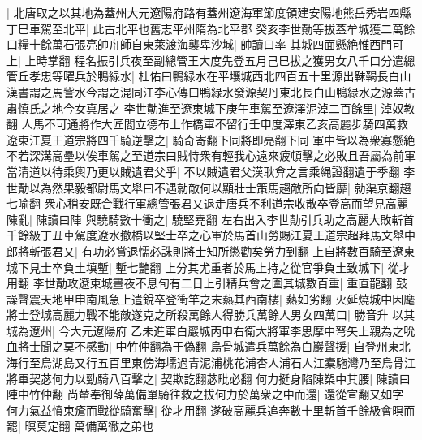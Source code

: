 |{
	北唐取之以其地為蓋州大元遼陽府路有蓋州遼海軍節度領建安陽地熊岳秀岩四縣}
丁巳車駕至北平|{
	此古北平也舊志平州隋為北平郡}
癸亥李世勣等拔蓋牟城獲二萬餘口糧十餘萬石張亮帥舟師自東萊渡海襲卑沙城|{
	帥讀曰率}
其城四面懸絶惟西門可上|{
	上時掌翻}
程名振引兵夜至副總管王大度先登五月己巳拔之獲男女八千口分遣總管丘孝忠等曜兵於鴨緑水|{
	杜佑曰鴨緑水在平壤城西北四百五十里源出靺鞨長白山漢書謂之馬訾水今謂之混同江李心傳曰鴨緑水發源契丹東北長白山鴨緑水之源蓋古肅慎氏之地今女真居之}
李世勣進至遼東城下庚午車駕至遼澤泥淖二百餘里|{
	淖奴教翻}
人馬不可通將作大匠閻立德布土作橋軍不留行壬申度澤東乙亥高麗步騎四萬救遼東江夏王道宗將四千騎逆擊之|{
	騎奇寄翻下同將即亮翻下同}
軍中皆以為衆寡懸絶不若深溝高壘以俟車駕之至道宗曰賊恃衆有輕我心遠來疲頓擊之必敗且吾屬為前軍當清道以待乘輿乃更以賊遺君父乎|{
	不以賊遺君父漢耿弇之言乘䋲證翻遺于季翻}
李世勣以為然果毅都尉馬文舉曰不遇勍敵何以顯壯士策馬趨敵所向皆靡|{
	勍渠京翻趨七喻翻}
衆心稍安既合戰行軍總管張君乂退走唐兵不利道宗收散卒登高而望見高麗陳亂|{
	陳讀曰陣}
與驍騎數十衝之|{
	驍堅堯翻}
左右出入李世勣引兵助之高麗大敗斬首千餘級丁丑車駕度遼水撤橋以堅士卒之心軍於馬首山勞賜江夏王道宗超拜馬文舉中郎將斬張君乂|{
	有功必賞退懦必誅則將士知所懲勸矣勞力到翻}
上自將數百騎至遼東城下見士卒負土填塹|{
	塹七艷翻}
上分其尤重者於馬上持之從官爭負土致城下|{
	從才用翻}
李世勣攻遼東城晝夜不息旬有二日上引精兵會之圍其城數百重|{
	重直龍翻}
鼓譟聲震天地甲申南風急上遣銳卒登衝竿之末爇其西南樓|{
	爇如劣翻}
火延燒城中因麾將士登城高麗力戰不能敵遂克之所殺萬餘人得勝兵萬餘人男女四萬口|{
	勝音升}
以其城為遼州|{
	今大元遼陽府}
乙未進軍白巖城丙申右衛大將軍李思摩中弩矢上親為之吮血將士聞之莫不感動|{
	中竹仲翻為于偽翻}
烏骨城遣兵萬餘為白巖聲援|{
	自登州東北海行至烏湖島又行五百里東傍海壖過青泥浦桃花浦杏人浦石人江槖駞灣乃至烏骨江}
將軍契苾何力以勁騎八百擊之|{
	契欺訖翻苾毗必翻}
何力挺身陷陳槊中其腰|{
	陳讀曰陣中竹仲翻}
尚輦奉御薛萬備單騎往救之拔何力於萬衆之中而還|{
	還從宣翻又如字}
何力氣益憤束瘡而戰從騎奮擊|{
	從才用翻}
遂破高麗兵追奔數十里斬首千餘級會暝而罷|{
	暝莫定翻}
萬備萬徹之弟也

